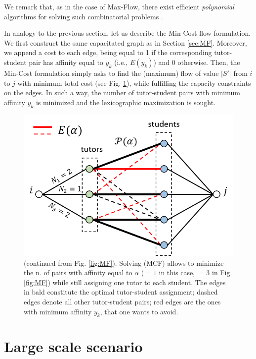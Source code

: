 \documentclass[11pt,oneside,a4paper]{article}     %
\begin{document}
We remark that, as in the case of Max-Flow, there exist efficient \emph{polynomial} algorithms for solving such combinatorial problems \cite{bazaraa2011linear}.

In analogy to the previous section, let us describe the Min-Cost flow formulation. We first construct the same capacitated graph as in Section \ref{sec:MF}. Moreover, we append a cost to each edge, being equal to 1 if the corresponding tutor-student pair has affinity equal to $y_k$ (i.e., $E(y_k)$) and 0 otherwise. Then, the Min-Cost formulation simply asks to find the (maximum) flow of value $|S'|$ from $i$ to $j$ with minimum total cost (see Fig. \ref{fig:MCF}), while fulfilling the capacity constraints on the edges. In such a way, the number of tutor-student pairs with minimum affinity $y_k$ is minimized and the lexicographic maximization is sought.

\begin{figure}
\centering
\includegraphics[scale=.65]{figs/mincost.png}
\caption{(continued from Fig. \ref{fig:MF}). Solving (MCF) allows to minimize the n. of pairs with affinity equal to $\alpha$ ($=1$ in this case, $=3$ in Fig. \ref{fig:MF}) while still assigning one tutor to each student. The edges in bald constitute the optimal tutor-student assignment; dashed edges denote all other tutor-student pairs; red edges are the ones with minimum affinity $y_k$, that one wants to avoid.}
\label{fig:MCF}
\end{figure}


\section{Large scale scenario} \label{sec:clustering}
\end{document}
